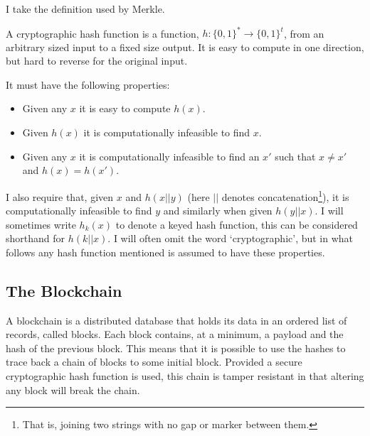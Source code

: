 \documentclass[12pt,a4paper,twoside,openright]{report}
\begin{document}

I take the definition used by Merkle\cite{merkle-thesis}.

A cryptographic hash function is a function, $h: \{0, 1\}^* \to \{0, 1\}^t$, from an arbitrary sized input to a fixed size output.
It is easy to compute in one direction, but hard to reverse for the original input.

It must have the following properties:
\begin{itemize}
\item Given any $x$ it is easy to compute $h(x)$.
\item Given $h(x)$ it is computationally infeasible to find $x$.
\item Given any $x$ it is computationally infeasible to find an $x'$ such that $x \neq x'$ and $h(x) = h(x')$.
\end{itemize}

I also require that, given $x$ and $h(x || y)$ (here $||$ denotes concatenation\footnote{That is, joining two strings with no gap or marker between them.}), it is computationally infeasible to find $y$
and similarly when given $h(y || x)$.
I will sometimes write $h_k(x)$ to denote a keyed hash function,
this can be considered shorthand for $h(k || x)$.
I will often omit the word `cryptographic', but in what follows any hash function mentioned is assumed to have these properties.


\subsection{The Blockchain}

A blockchain is a distributed database that holds its data in an ordered list of records, called blocks.
Each block contains, at a minimum, a payload and the hash of the previous block.
This means that it is possible to use the hashes to trace back a chain of blocks to some initial block.
Provided a secure cryptographic hash function is used, this chain is tamper resistant in that altering any block will break the chain.
\end{document}
